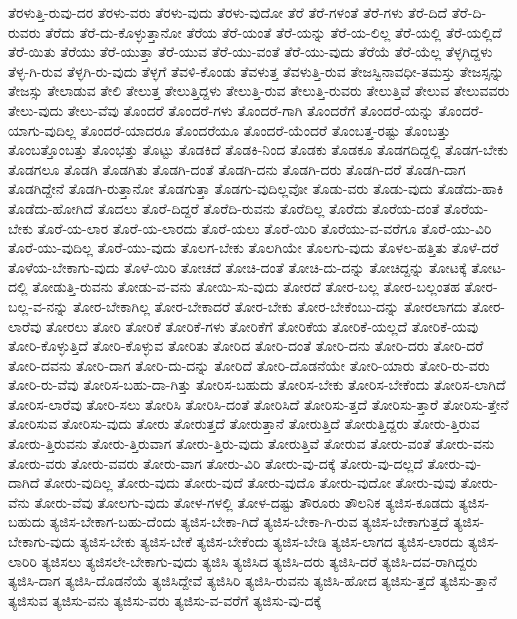 {ತೆರಳುತ್ತಿ-ರುವು-ದರ
ತೆರಳು-ವರು
ತೆರಳು-ವುದು
ತೆರಳು-ವುದೋ
ತೆರೆ
ತೆರೆ-ಗಳಂತೆ
ತೆರೆ-ಗಳು
ತೆರೆ-ದಿದೆ
ತೆರೆ-ದಿ-ರುವರು
ತೆರೆದು
ತೆರೆ-ದು-ಕೊಳ್ಳುತ್ತಾನೋ
ತೆರೆಯ
ತೆರೆ-ಯಂತೆ
ತೆರೆ-ಯನ್ನು
ತೆರೆ-ಯ-ಲಿಲ್ಲ
ತೆರೆ-ಯಲ್ಲಿ
ತೆರೆ-ಯಲ್ಲಿದೆ
ತೆರೆ-ಯಿತು
ತೆರೆಯು
ತೆರೆ-ಯುತ್ತಾ
ತೆರೆ-ಯುವ
ತೆರೆ-ಯು-ವಂತೆ
ತೆರೆ-ಯು-ವುದು
ತೆರೆಯೆ
ತೆರೆ-ಯೆಲ್ಲ
ತೆಳ್ಳಗಿದ್ದಳು
ತೆಳ್ಳ-ಗಿ-ರುವ
ತೆಳ್ಳಗಿ-ರು-ವುದು
ತೆಳ್ಳಗೆ
ತೆವಳಿ-ಕೊಂಡು
ತೆವಳುತ್ತ
ತೆವಳುತ್ತಿ-ರುವ
ತೇಜಸ್ವಿನಾವಧೀ-ತಮಸ್ತು
ತೇಜಸ್ಸನ್ನು
ತೇಜಸ್ಸು
ತೇಲಾಡುವ
ತೇಲಿ
ತೇಲುತ್ತ
ತೇಲುತ್ತಿದ್ದಳು
ತೇಲುತ್ತಿ-ರುವ
ತೇಲುತ್ತಿ-ರುವರು
ತೇಲುತ್ತಿವೆ
ತೇಲುವ
ತೇಲುವವರು
ತೇಲು-ವುದು
ತೇಲು-ವೆವು
ತೊಂದರೆ
ತೊಂದರೆ-ಗಳು
ತೊಂದರೆ-ಗಾಗಿ
ತೊಂದರೆಗೆ
ತೊಂದರೆ-ಯನ್ನು
ತೊಂದರೆ-ಯಾಗು-ವುದಿಲ್ಲ
ತೊಂದರೆ-ಯಾದರೂ
ತೊಂದರೆಯೂ
ತೊಂದರೆ-ಯೆಂದರೆ
ತೊಂಬತ್ತ-ರಷ್ಟು
ತೊಂಬತ್ತು
ತೊಂಬತ್ತೊಂಬತ್ತು
ತೊಂಭತ್ತು
ತೊಟ್ಟು
ತೊಡಕಿದೆ
ತೊಡಕಿ-ನಿಂದ
ತೊಡಕು
ತೊಡಕೂ
ತೊಡಗದಿದ್ದಲ್ಲಿ
ತೊಡಗ-ಬೇಕು
ತೊಡಗಲೂ
ತೊಡಗಿ
ತೊಡಗಿತು
ತೊಡಗಿ-ದಂತೆ
ತೊಡಗಿ-ದನು
ತೊಡಗಿ-ದರು
ತೊಡಗಿ-ದರೆ
ತೊಡಗಿ-ದಾಗ
ತೊಡಗಿದ್ದೇನೆ
ತೊಡಗಿ-ರುತ್ತಾನೋ
ತೊಡಗುತ್ತಾ
ತೊಡಗು-ವುದಿಲ್ಲವೋ
ತೊಡು-ವರು
ತೊಡು-ವುದು
ತೊಡೆದು-ಹಾಕಿ
ತೊಡೆದು-ಹೋಗಿದೆ
ತೊದಲು
ತೊರೆ-ದಿದ್ದರೆ
ತೊರೆದಿ-ರುವನು
ತೊರೆದಿಲ್ಲ
ತೊರೆದು
ತೊರೆಯ-ದಂತೆ
ತೊರೆಯ-ಬೇಕು
ತೊರೆ-ಯ-ಲಾರ
ತೊರೆ-ಯ-ಲಾರದು
ತೊರೆ-ಯಲು
ತೊರೆ-ಯಿರಿ
ತೊರೆಯು-ವ-ವರೆಗೂ
ತೊರೆ-ಯು-ವಿರಿ
ತೊರೆ-ಯು-ವುದಿಲ್ಲ
ತೊರೆ-ಯು-ವುದು
ತೊಲಗ-ಬೇಕು
ತೊಲಗಿಯೇ
ತೊಲಗು-ವುದು
ತೊಳಲ-ಹತ್ತಿತು
ತೊಳೆ-ದರೆ
ತೊಳೆಯ-ಬೇಕಾಗು-ವುದು
ತೊಳೆ-ಯಿರಿ
ತೋಚದೆ
ತೋಚಿ-ದಂತೆ
ತೋಚಿ-ದು-ದನ್ನು
ತೋಚಿದ್ದನ್ನು
ತೋಟಕ್ಕೆ
ತೋಟ-ದಲ್ಲಿ
ತೋಡುತ್ತಿ-ರುವನು
ತೋಡು-ವ-ವನು
ತೋಯಿ-ಸು-ವುದು
ತೋರದೆ
ತೋರ-ಬಲ್ಲ
ತೋರ-ಬಲ್ಲಂತಹ
ತೋರ-ಬಲ್ಲ-ವ-ನನ್ನು
ತೋರ-ಬೇಕಾಗಿಲ್ಲ
ತೋರ-ಬೇಕಾದರೆ
ತೋರ-ಬೇಕು
ತೋರ-ಬೇಕೆಂಬು-ದನ್ನು
ತೋರಲಾಗದು
ತೋರ-ಲಾರೆವು
ತೋರಲು
ತೋರಿ
ತೋರಿಕೆ
ತೋರಿಕೆ-ಗಳು
ತೋರಿಕೆಗೆ
ತೋರಿಕೆಯ
ತೋರಿಕೆ-ಯಲ್ಲದೆ
ತೋರಿಕೆ-ಯವು
ತೋರಿ-ಕೊಳ್ಳುತ್ತಿದೆ
ತೋರಿ-ಕೊಳ್ಳುವ
ತೋರಿತು
ತೋರಿದ
ತೋರಿ-ದಂತೆ
ತೋರಿ-ದನು
ತೋರಿ-ದರು
ತೋರಿ-ದರೆ
ತೋರಿ-ದವನು
ತೋರಿ-ದಾಗ
ತೋರಿ-ದು-ದನ್ನು
ತೋರಿದೆ
ತೋರಿ-ದೊಡನೆಯೇ
ತೋರಿ-ಯಾರು
ತೋರಿ-ರು-ವರು
ತೋರಿ-ರು-ವೆವು
ತೋರಿಸ-ಬಹು-ದಾ-ಗಿತ್ತು
ತೋರಿಸ-ಬಹುದು
ತೋರಿಸ-ಬೇಕು
ತೋರಿಸ-ಬೇಕೆಂದು
ತೋರಿಸ-ಲಾಗಿದೆ
ತೋರಿಸ-ಲಾರೆವು
ತೋರಿ-ಸಲು
ತೋರಿಸಿ
ತೋರಿಸಿ-ದಂತೆ
ತೋರಿಸಿದೆ
ತೋರಿಸು-ತ್ತದೆ
ತೋರಿಸು-ತ್ತಾರೆ
ತೋರಿಸು-ತ್ತೇನೆ
ತೋರಿಸುವ
ತೋರಿಸು-ವುದು
ತೋರು
ತೋರುತ್ತದೆ
ತೋರುತ್ತಾನೆ
ತೋರುತ್ತಿದೆ
ತೋರುತ್ತಿದ್ದರು
ತೋರು-ತ್ತಿರುವ
ತೋರು-ತ್ತಿರುವನು
ತೋರು-ತ್ತಿರುವಾಗ
ತೋರು-ತ್ತಿರು-ವುದು
ತೋರುತ್ತಿವೆ
ತೋರುವ
ತೋರು-ವಂತೆ
ತೋರು-ವನು
ತೋರು-ವರು
ತೋರು-ವವರು
ತೋರು-ವಾಗ
ತೋರು-ವಿರಿ
ತೋರು-ವು-ದಕ್ಕೆ
ತೋರು-ವು-ದಲ್ಲದೆ
ತೋರು-ವು-ದಾಗಿದೆ
ತೋರು-ವುದಿಲ್ಲ
ತೋರು-ವುದು
ತೋರು-ವುದೆ
ತೋರು-ವುದೊ
ತೋರು-ವುದೋ
ತೋರು-ವುವು
ತೋರು-ವೆನು
ತೋರು-ವೆವು
ತೋಲಗು-ವುದು
ತೋಳ-ಗಳಲ್ಲಿ
ತೋಳ-ದಷ್ಟು
ತೌರೂರು
ತೌಲನಿಕ
ತ್ಯಜಿಸ-ಕೂಡದು
ತ್ಯಜಿಸ-ಬಹುದು
ತ್ಯಜಿಸ-ಬೇಕಾಗ-ಬಹು-ದೆಂದು
ತ್ಯಜಿಸ-ಬೇಕಾ-ಗಿದೆ
ತ್ಯಜಿಸ-ಬೇಕಾ-ಗಿ-ರುವ
ತ್ಯಜಿಸ-ಬೇಕಾಗುತ್ತದೆ
ತ್ಯಜಿಸ-ಬೇಕಾಗು-ವುದು
ತ್ಯಜಿಸ-ಬೇಕು
ತ್ಯಜಿಸ-ಬೇಕೆ
ತ್ಯಜಿಸ-ಬೇಕೆಂದು
ತ್ಯಜಿಸ-ಬೇಡಿ
ತ್ಯಜಿಸ-ಲಾಗದ
ತ್ಯಜಿಸ-ಲಾರದು
ತ್ಯಜಿಸ-ಲಾರಿರಿ
ತ್ಯಜಿಸಲು
ತ್ಯಜಿಸಲೇ-ಬೇಕಾಗು-ವುದು
ತ್ಯಜಿಸಿ
ತ್ಯಜಿಸಿದ
ತ್ಯಜಿಸಿ-ದರು
ತ್ಯಜಿಸಿ-ದರೆ
ತ್ಯಜಿಸಿ-ದವ-ರಾಗಿದ್ದರು
ತ್ಯಜಿಸಿ-ದಾಗ
ತ್ಯಜಿಸಿ-ದೊಡನೆಯೆ
ತ್ಯಜಿಸಿದ್ದೇವೆ
ತ್ಯಜಿಸಿರಿ
ತ್ಯಜಿಸಿ-ರುವನು
ತ್ಯಜಿಸಿ-ಹೋದ
ತ್ಯಜಿಸು-ತ್ತದೆ
ತ್ಯಜಿಸು-ತ್ತಾನೆ
ತ್ಯಜಿಸುವ
ತ್ಯಜಿಸು-ವನು
ತ್ಯಜಿಸು-ವರು
ತ್ಯಜಿಸು-ವ-ವರೆಗೆ
ತ್ಯಜಿಸು-ವು-ದಕ್ಕೆ
}
